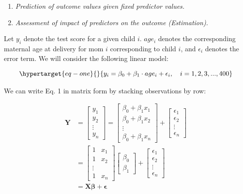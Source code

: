 \documentclass[
  letterpaper,
  DIV=11,
  numbers=noendperiod]{scrreprt}
\begin{document}
\begin{enumerate}
\def\labelenumi{\arabic{enumi}.}
\item
  \emph{Prediction of outcome values given fixed predictor values.}
\item
  \emph{Assessment of impact of predictors on the outcome (Estimation).}
\end{enumerate}

Let \(y_i\) denote the test score for a given child \(i\). \(age_i\)
denotes the corresponding maternal age at delivery for mom \(i\)
corresponding to child \(i\), and \(\epsilon_i\) denotes the error term.
We will consider the following linear model:

\begin{equation}\protect\hypertarget{eq-one}{}{y_i = \beta_0 + \beta_1 \cdot age_i + \epsilon_i, \quad i = 1,2,3,...,400}\label{eq-one}\end{equation}

We can write Eq. 1 in matrix form by stacking observations by row:

\[\begin{align}
\mathbf{Y}& = \begin{bmatrix} y_1 \\ y_2\\ \vdots \\ y_n \end{bmatrix} = 
\begin{bmatrix}
\beta_0 + \beta_1 x_1\\ \beta_0 + \beta_1 x_2 \\ \vdots \\ \beta_0 + \beta_1 x_n \end{bmatrix} + \begin{bmatrix} \epsilon_1 \\ \epsilon_2 \\  \vdots \\ \epsilon_n \end{bmatrix}\\
& = \begin{bmatrix} 1 & x_1\\1 & x_2\\ \vdots \\ 1 & x_n\end{bmatrix} \begin{bmatrix}\beta_0 \\ \beta_1\end{bmatrix} + \begin{bmatrix} \epsilon_1 \\ \epsilon_2 \\  \vdots \\ \epsilon_n \end{bmatrix}\\
&= \mathbf{X\beta + \epsilon}
\end{align}\]
\end{document}
